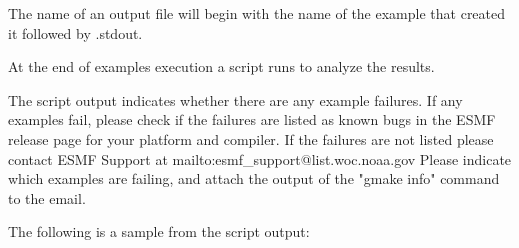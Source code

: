 The name of an output file will begin with the name of the example
that created it followed by .stdout.

At the end of examples execution a script runs to analyze the results.

The script output indicates whether there are any example failures.
If any examples fail, please check if the failures are listed as known bugs in the ESMF release
page 
for your platform and compiler.
If the failures are not listed please contact ESMF Support at 
{mailto:esmf\_support@list.woc.noaa.gov}
Please indicate which examples are failing, and attach the output of the "gmake info" command to the email.


The following is a sample from the script output:


